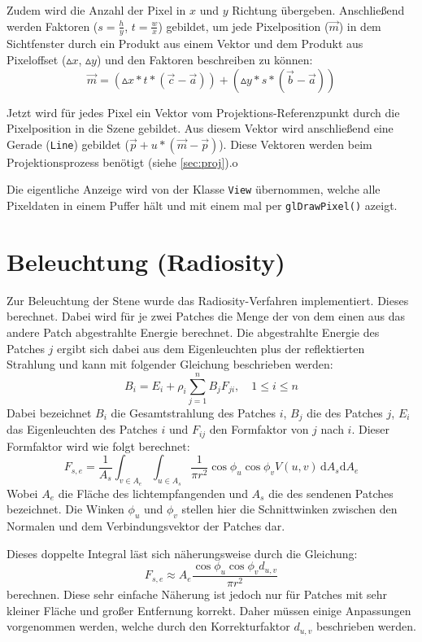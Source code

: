 \documentclass[final,a4paper,11pt,notitlepage,halfparskip]{scrreprt}
\begin{document}
Zudem wird die Anzahl der Pixel in $x$ und $y$ Richtung übergeben. Anschließend 
werden Faktoren ($s = \frac{h}{y}$, $t = \frac{w}{x}$) gebildet, um jede 
Pixelposition ($\vec{m}$) in dem Sichtfenster durch ein Produkt aus einem Vektor 
und dem Produkt aus Pixeloffset ($\vartriangle x$, $\vartriangle y$) und den 
Faktoren beschreiben zu können:
$$\vec{m} = (\vartriangle x * t * (\vec{c} - \vec{a})) + (\vartriangle y * s * 
(\vec{b} - \vec{a}))$$

Jetzt wird für jedes Pixel ein Vektor vom Projektions-Referenzpunkt durch die
Pixelposition in die Szene gebildet. Aus diesem Vektor wird anschließend eine
Gerade (\texttt{Line}) gebildet ($\vec{p} + u * (\vec{m} - \vec{p})$). Diese
Vektoren werden beim Projektionsprozess benötigt (siehe \ref{sec:proj}).o

Die eigentliche Anzeige wird von der Klasse \texttt{View} übernommen, welche
alle Pixeldaten in einem Puffer hält und mit einem mal per 
\texttt{glDrawPixel()} azeigt.

\section{Beleuchtung (Radiosity)}
Zur Beleuchtung der Stene wurde das Radiosity-Verfahren implementiert. Dieses
berechnet. Dabei wird für je zwei Patches die Menge der von dem einen aus das
andere Patch abgestrahlte Energie berechnet. Die abgestrahlte Energie des
Patches $j$ ergibt sich dabei aus dem Eigenleuchten plus der reflektierten 
Strahlung und kann mit folgender Gleichung beschrieben werden:
$$B_i = E_i + \rho_i \sum_{j=1}^n B_jF_{ji},\quad 1 \le i \le n$$
Dabei bezeichnet $B_i$ die Gesamtstrahlung des Patches $i$, $B_j$ die des
Patches $j$, $E_i$ das Eigenleuchten des Patches $i$ und $F_{ij}$ den Formfaktor
von $j$ nach $i$. Dieser Formfaktor wird wie folgt berechnet:
$$F_{s,e} = \frac{1}{A_s}\int_{v\in A_e}\int_{u\in A_s} \frac{1}{\pi r^2} 
\cos\phi_u\cos\phi_v V(u,v) \,\mathrm dA_s \mathrm dA_e$$
Wobei $A_{e}$ die Fläche des lichtempfangenden und $A_s$ die des sendenen
Patches bezeichnet. Die Winken $\phi_u$ und $\phi_v$ stellen hier die
Schnittwinken zwischen den Normalen und dem Verbindungsvektor der Patches dar.

Dieses doppelte Integral läst sich näherungsweise durch die Gleichung:
$$F_{s,e} \approx A_e \frac{\cos\phi_u\cos\phi_v d_{u,v}}{\pi r^2}$$
berechnen. Diese sehr einfache Näherung ist jedoch nur für Patches mit sehr
kleiner Fläche und großer Entfernung korrekt. Daher müssen einige Anpassungen
vorgenommen werden, welche durch den Korrekturfaktor $d_{u,v}$ beschrieben
werden.
\end{document}
